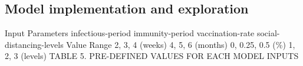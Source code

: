 \documentclass[smallextended]{svjour3}       %
\begin{document}
\subsection{Model implementation and exploration}

Input Parameters
infectious-period
immunity-period
vaccination-rate
social-distancing-levels
Value Range
2, 3, 4 (weeks)
4, 5, 6 (months)
0, 0.25, 0.5 (\%)
1, 2, 3 (levels)
        TABLE 5. PRE-DEFINED VALUES FOR EACH MODEL INPUTS
        
\end{document}
